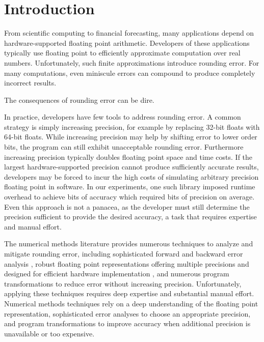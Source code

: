 \documentclass[paper.tex]{subfiles}
\begin{document}
\section{Introduction}
\label{sec:introduction}

From scientific computing to financial forecasting, many applications
depend on hardware-supported floating point arithmetic. Developers of
these applications typically use floating point to efficiently
approximate computation over real numbers.  Unfortunately, such finite
approximations introduce rounding error.  For many computations, even
miniscule errors can compound to produce completely incorrect results.

The consequences of rounding error can be dire. 

In practice, developers have few tools to address rounding error.  A
common strategy is simply increasing precision, for example by
replacing 32-bit floats with 64-bit floats.  While increasing
precision may help by shifting error to lower order bits, the program
can still exhibit unacceptable rounding error.  Furthermore increasing
precision typically doubles floating point space and time costs. If
the largest hardware-supported precision cannot produce sufficiently
accurate results, developers may be forced to incur the high costs of
simulating arbitrary precision floating point in software.  In our
experiments, one such library imposed  runtime
overhead to achieve  bits of accuracy which required
 bits of precision on average. Even this approach is not a
panacea, as the developer must still determine the precision
sufficient to provide the desired accuracy, a task that requires
expertise and manual effort.

The numerical methods literature provides numerous techniques to
analyze and mitigate rounding error, including sophisticated forward
and backward error analysis , robust floating point
representations offering multiple precisions and designed for
efficient hardware implementation , and numerous program
transformations to reduce error  without increasing
precision.  Unfortunately, applying these techniques requires deep
expertise and substantial manual effort.  Numerical methods techniques
rely on a deep understanding of the floating point representation,
sophisticated error analyses to choose an appropriate precision, and
program transformations to improve accuracy when additional precision
is unavailable or too expensive.
\end{document}
